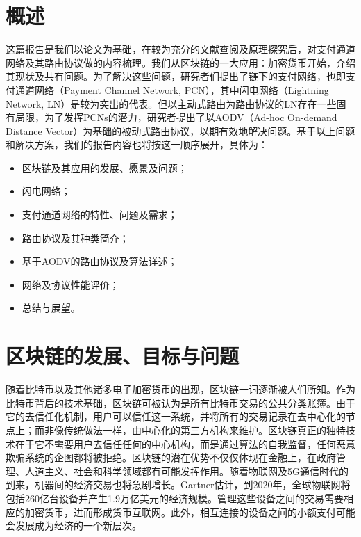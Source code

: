 \documentclass[12pt,a4paper]{article}
\begin{document}
\setlength{\parindent}{2em}



\tableofcontents
\clearpage

\section{概述}
这篇报告是我们以论文\cite{hoenisch2018aodv}为基础，在较为充分的文献查阅及原理探究后，对支付通道网络及其路由协议做的内容梳理。我们从区块链的一大应用：加密货币开始，介绍其现状及共有问题。为了解决这些问题，研究者们提出了链下的支付网络，也即支付通道网络（Payment Channel Network, PCN），其中闪电网络（Lightning Network, LN）是较为突出的代表。但以主动式路由为路由协议的LN存在一些固有局限，为了发挥PCNs的潜力，研究者提出了以AODV（Ad-hoc On-demand Distance Vector）为基础的被动式路由协议，以期有效地解决问题。基于以上问题和解决方案，我们的报告内容也将按这一顺序展开，具体为：
\begin{itemize}
	\item 区块链及其应用的发展、愿景及问题；
	\item 闪电网络；
	\item 支付通道网络的特性、问题及需求；
	\item 路由协议及其种类简介；
	\item 基于AODV的路由协议及算法详述；
	\item 网络及协议性能评价；
	\item 总结与展望。
\end{itemize}

\section{区块链的发展、目标与问题}
随着比特币\cite{nakamoto2008bitcoin}以及其他诸多电子加密货币的出现，区块链一词逐渐被人们所知。作为比特币背后的技术基础，区块链可被认为是所有比特币交易的公共分类账簿。\cite{swan2015blockchain}由于它的去信任化机制，用户可以信任这一系统，并将所有的交易记录在去中心化的节点上；而非像传统做法一样，由中心化的第三方机构来维护。区块链真正的独特技术在于它不需要用户去信任任何的中心机构，而是通过算法的自我监督，任何恶意欺骗系统的企图都将被拒绝。区块链的潜在优势不仅仅体现在金融上，在政府管理、人道主义、社会和科学领域都有可能发挥作用。随着物联网及5G通信时代的到来，机器间的经济交易也将急剧增长。Gartner\cite{iot_economic}估计，到2020年，全球物联网将包括260亿台设备并产生1.9万亿美元的经济规模。管理这些设备之间的交易需要相应的加密货币，进而形成货币互联网。此外，相互连接的设备之间的小额支付可能会发展成为经济的一个新层次\cite{new_layer_economy}。
\end{document}
